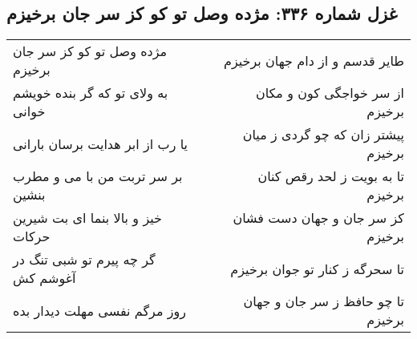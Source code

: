 \begin{center}
\section*{غزل شماره ۳۳۶: مژده وصل تو کو کز سر جان برخیزم}
\label{sec:sh336}
\begin{longtable}{l p{0.5cm} r}
مژده وصل تو کو کز سر جان برخیزم
&&
طایر قدسم و از دام جهان برخیزم
\\
به ولای تو که گر بنده خویشم خوانی
&&
از سر خواجگی کون و مکان برخیزم
\\
یا رب از ابر هدایت برسان بارانی
&&
پیشتر زان که چو گردی ز میان برخیزم
\\
بر سر تربت من با می و مطرب بنشین
&&
تا به بویت ز لحد رقص کنان برخیزم
\\
خیز و بالا بنما ای بت شیرین حرکات
&&
کز سر جان و جهان دست فشان برخیزم
\\
گر چه پیرم تو شبی تنگ در آغوشم کش
&&
تا سحرگه ز کنار تو جوان برخیزم
\\
روز مرگم نفسی مهلت دیدار بده
&&
تا چو حافظ ز سر جان و جهان برخیزم
\\
\end{longtable}
\end{center}
